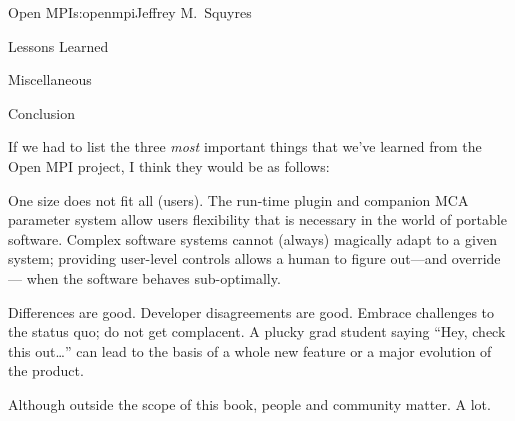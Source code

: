 \begin{aosachapter}{Open MPI}{s:openmpi}{Jeffrey M.\ Squyres}
\begin{aosasect1}{Lessons Learned}
\begin{aosasect2}{Miscellaneous}
\begin{aosaitemize}
\end{aosaitemize}

\end{aosasect2}


\begin{aosasect2}{Conclusion}

If we had to list the three \emph{most} important things that we've
learned from the Open MPI project, I think they would be as follows:

\begin{aosaitemize}
\item One size does not fit all (users).  The run-time plugin and
  companion MCA parameter system allow users flexibility that is
  necessary in the world of portable software.  Complex software
  systems cannot (always) magically adapt to a given system; providing
  user-level controls allows a human to figure out---and override---
  when the software behaves sub-optimally.

\item Differences are good.  Developer disagreements are good.
  Embrace challenges to the status quo; do not get complacent.  A
  plucky grad student saying ``Hey, check this out{\ldots}'' can lead to
  the basis of a whole new feature or a major evolution of the
  product.

\item Although outside the scope of this book, people and community
  matter.  A lot.
\end{aosaitemize}

\end{aosasect2}

\end{aosasect1}

\end{aosachapter}


